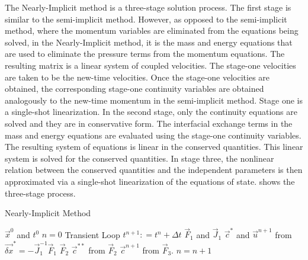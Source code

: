 The Nearly-Implicit method is a three-stage solution process.
The first stage is similar to the semi-implicit method.
However, as opposed to the semi-implicit method, where the momentum variables are eliminated from the equations being solved, in the Nearly-Implicit method, it is the mass and energy equations that are used to eliminate the pressure terms from the momentum equations.
The resulting matrix is a linear system of coupled velocities.
The stage-one velocities are taken to be the new-time velocities.
Once the stage-one velocities are obtained, the corresponding stage-one continuity variables are obtained analogously to the new-time momentum in the semi-implicit method.
Stage one is a single-shot linearization.
In the second stage, only the continuity equations are solved and they are in conservative form.
The interfacial exchange terms in the mass and energy equations are evaluated using the stage-one continuity variables.
The resulting system of equations is linear in the conserved quantities.
This linear system is solved for the conserved quantities.
In stage three, the nonlinear relation between the conserved quantities and the independent parameters is then approximated via a single-shot linearization of the equations of state.
 shows the three-stage process.

\begin{algo}[H]
\caption{Nearly-Implicit Method}
\label{alg:ni}
\setlength{\baselineskip}{0.625\baselineskip}
\begin{algorithmic}[1]
\Require $\vec{x}^{0}$ and $t^{0}$
\Set $n = 0$
\Loop \; Transient Loop
    \State $t^{n+1} : = t^{n} + \Delta t$
	\Calculate $\vec{F}_1$ and $\vec{J}_1$
	\Calculate $\vec{c}^{*}$ and $\vec{u}^{n+1}$ from $\vec{\delta x}^{*} = -\vec{J}^{-1}_1\vec{F}_1$
	\Calculate $\vec{F}_2$
	\Calculate $\vec{c}^{**}$ from $\vec{F}_2$
	\Calculate $\vec{c}^{n+1}$ from $\vec{F}_3$.
	\State $n = n + 1$
\EndLoop
\end{algorithmic}
\end{algo}


